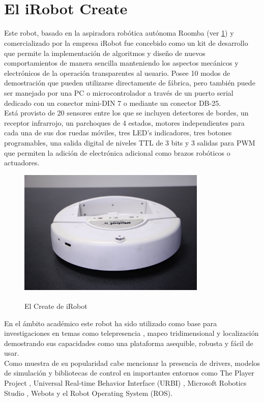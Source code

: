 \documentclass[letterpaper,openright,12pt]{book}
\begin{document}
\section{El iRobot Create\textsuperscript{\textregistered}}
\label{sec:iRobot}
Este robot, basado en la aspiradora robótica autónoma Roomba (ver \ref{fig:create}) y comercializado por la empresa iRobot fue concebido como un kit de desarrollo que permite la implementación de algoritmos y diseño de nuevos comportamientos de manera sencilla manteniendo los aspectos mecánicos y electrónicos de la operación transparentes al usuario\cite{irobotm}. Posee 10 modos de demostración que pueden utilizarse directamente de fábrica, pero también puede ser manejado por una PC o microcontrolador a través de un puerto serial dedicado con un conector mini-DIN 7 o mediante un conector DB-25.\\
Está provisto de 20 sensores entre los que se incluyen detectores de bordes, un receptor infrarrojo, un parchoques de 4 estados, motores independientes para cada una de sus dos ruedas móviles, tres LED's indicadores, tres botones programables, una salida digital de niveles TTL de 3 bits y 3 salidas para PWM que permiten la adición de electrónica adicional como brazos robóticos o actuadores\cite{irobotopen}\cite{irobotp}.\\
\begin{figure}
\begin{center}
\includegraphics[width=0.8\textwidth]{figures/create.jpg}
\caption{El Create\textsuperscript{\textregistered} de iRobot}
\centering
\label{fig:create}
\end{center}
\end{figure} 
En el ámbito académico este robot ha sido utilizado como base para investigaciones en temas como telepresencia \cite{lee}, mapeo tridimensional \cite{ellaithy}\cite{saenz} y localización \cite{housten}\cite{kuipers} demostrando sus capacidades como una plataforma asequible, robusta y fácil de usar.\\
Como muestra de su popularidad cabe mencionar la presencia de drivers, modelos de simulación y bibliotecas de control en importantes entornos como The Player Project \cite{pharos}, Universal Real-time Behavior Interface (URBI) \cite{urbiforge}, Microsoft Robotics Studio \cite{microsoft}, Webots \cite{microsoft} y el Robot Operating System (ROS)\cite{rosorg}.\\
\end{document}
